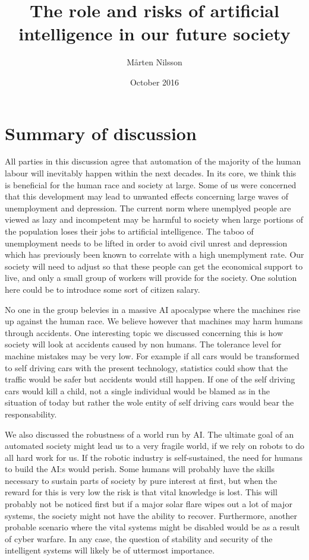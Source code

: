 \documentclass{article}
\title{ The role and risks of artificial intelligence in our future society }
\author{ Mårten Nilsson }
\date{October 2016}
\begin{document}

\thispagestyle{empty}

\section*{Summary of discussion}
All parties in this discussion agree that automation of the majority of the human labour will inevitably happen within the next decades. In its core, we think this is beneficial for the human race and society at large. Some of us were concerned that this development may lead to unwanted effects concerning large waves of unemployment and depression. The current norm where unemplyed people are viewed as lazy and incompetent may be harmful to society when large portions of the population loses their jobs to artificial intelligence. The taboo of unemployment needs to be lifted in order to avoid civil unrest and depression which has previously been known to correlate with a high unemplyment rate. Our society will need to adjust so that these people can get the economical support to live, and only a small group of workers will provide for the society. One solution here could be to introduce some sort of citizen salary. 

No one in the group belevies in a massive AI apocalypse where the machines rise up against the human race. We believe however that machines may harm humans through accidents. One interesting topic we discussed concerning this is how society will look at accidents caused by non humans. The tolerance level for machine mistakes may be very low. For example if all cars would be transformed to self driving cars with the present technology, statistics could show that the traffic would be safer but accidents would still happen. If one of the self driving cars would kill a child, not a single individual would be blamed as in the situation of today but rather the wole entity of self driving cars would bear the responsability. 

We also discussed the robustness of a world run by AI. The ultimate goal of an automated society might lead us to a very fragile world, if we rely on robots to do all hard work for us. If the robotic industry is self-sustained, the need for humans to build the AI:s would perish. Some humans will probably have the skills necessary to sustain parts of society by pure interest at first, but when the reward for this is very low the risk is that vital knowledge is lost. This will probably not be noticed first but if a major solar flare wipes out a lot of major systems, the society might not have the ability to recover. Furthermore, another probable scenario where the vital systems might be disabled would be as a result of cyber warfare. In any case, the question of stability and security of the intelligent systems will likely be of uttermost importance.
\end{document}

